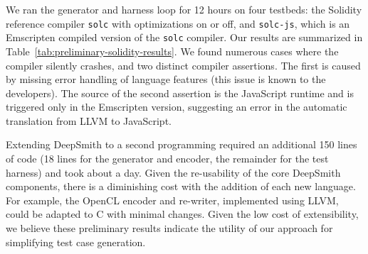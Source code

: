 We ran the generator and harness loop for 12 hours on four testbeds: the
Solidity reference compiler \texttt{solc} with optimizations on or off, and
\texttt{solc-js}, which is an Emscripten compiled version of the \texttt{solc}
compiler. Our results are summarized in Table~\ref{tab:preliminary-solidity-results}. We found
numerous cases where the compiler silently crashes, and two distinct compiler
assertions. The first is caused by missing error handling of language features
(this issue is known to the developers). The source of the second assertion is
the JavaScript runtime and is triggered only in the Emscripten version,
suggesting an error in the automatic translation from LLVM to JavaScript.

Extending DeepSmith to a second programming required an additional 150 lines of
code (18 lines for the generator and encoder, the remainder for the test
harness) and took about a day. Given the re-usability of the core DeepSmith
components, there is a diminishing cost with the addition of each new language.
For example, the OpenCL encoder and re-writer, implemented using LLVM, could be
adapted to C with minimal changes. Given the low cost of extensibility, we
believe these preliminary results indicate the utility of our approach for
simplifying test case generation.
